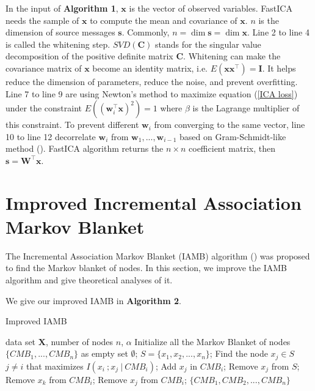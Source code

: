 \documentclass[twoside,11pt]{article}
\begin{document}
In the input of \textbf{Algorithm 1}, $\mathbf x$ is the vector of observed variables. FastICA needs the sample of $\mathbf x$ to compute the mean and covariance of $\mathbf x$. $n$ is the dimension of source messages $\mathbf s$. Commonly, $n=\dim\mathbf s=\dim\mathbf x$. Line 2 to line 4 is called the whitening step. $SVD(\mathbf C)$ stands for the singular value decomposition of the positive definite matrix $\mathbf C$. Whitening can make the covariance matrix of $\mathbf x$ become an identity matrix, i.e. $E(\mathbf x\mathbf x^\top)=\mathbf I$. It helps reduce the dimension of parameters, reduce the noise, and prevent overfitting. Line 7 to line 9 are using Newton’s method to maximize equation (\ref{ICA loss}) under the constraint $E((\mathbf w_i^\top\mathbf x)^2)=1$ where $\beta$ is the Lagrange multiplier of this constraint. To prevent different $\mathbf w_i$ from converging to the same vector, line 10 to line 12 decorrelate $\mathbf w_i$ from $\mathbf w_1,..., \mathbf w_{i-1}$ based on Gram-Schmidt-like method (\cite{kantorovich2016functional}). FastICA algorithm returns the $n\times n$ coefficient matrix, then $\mathbf s=\mathbf W^\top \mathbf x$.




















\section{Improved Incremental Association Markov Blanket}
The Incremental Association Markov Blanket (IAMB) algorithm (\cite{tsamardinos2003algorithms}) was proposed to find the Markov blanket of nodes. In this section, we improve the IAMB algorithm and give theoretical analyses of it.

We give our improved IAMB in \textbf{Algorithm 2}.
\begin{algorithm}
\renewcommand{\algorithmicrequire}{\textbf{Input:}}
\renewcommand{\algorithmicensure}{\textbf{Output:}}
\caption{Improved IAMB}
\label{Improved IAMB}
\begin{algorithmic}[1]
\REQUIRE data set $\mathbf X$, number of nodes $n$, $\alpha$
\STATE Initialize all the Markov Blanket of nodes $\{CMB_1, ..., CMB_n\}$ as empty set $\emptyset$;
\STATE $S=\{x_1, x_2, ..., x_n\}$;
\STATE Find the node $x_j\in S$ $j\neq i$ that maximizes $I(x_i\ ; x_j\ |\ CMB_i)$;
\STATE Add $x_j$ in $CMB_i$;
\STATE Remove $x_j$ from $S$;
\ENDIF
\ENDWHILE
{}
\STATE Remove $x_k$ from $CMB_i$;
\ENDIF
\ENDFOR
\ENDFOR
{}
\STATE Remove $x_j$ from $CMB_i$;
\ENDIF
\ENDFOR
\ENDFOR
\ENSURE $\{CMB_1, CMB_2, ..., CMB_n\}$
\end{algorithmic}
\end{algorithm}
\end{document}
